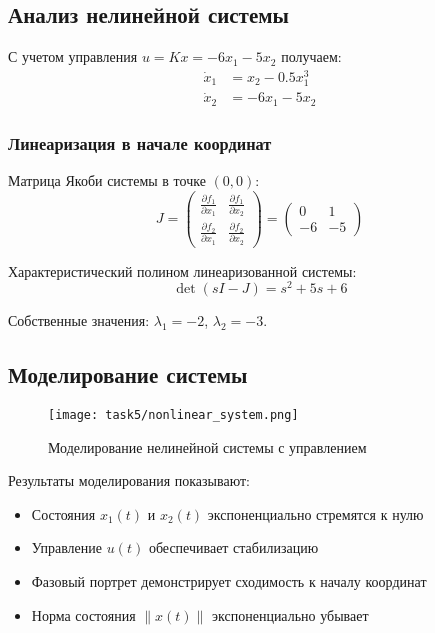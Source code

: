 \subsection{Анализ нелинейной системы}

С учетом управления $u = Kx = -6x_1 - 5x_2$ получаем:
\begin{align}
\dot{x}_1 &= x_2 - 0.5x_1^3 \\
\dot{x}_2 &= -6x_1 - 5x_2
\end{align}

\subsubsection{Линеаризация в начале координат}

Матрица Якоби системы в точке $(0,0)$:
\begin{equation}
J = \begin{pmatrix} 
\frac{\partial f_1}{\partial x_1} & \frac{\partial f_1}{\partial x_2} \\
\frac{\partial f_2}{\partial x_1} & \frac{\partial f_2}{\partial x_2}
\end{pmatrix} = \begin{pmatrix} 
0 & 1 \\
-6 & -5
\end{pmatrix}
\end{equation}

Характеристический полином линеаризованной системы:
\begin{equation}
\det(sI - J) = s^2 + 5s + 6
\end{equation}

Собственные значения: $\lambda_1 = -2$, $\lambda_2 = -3$.

\subsection{Моделирование системы}

\begin{figure}[H]
\centering
\texttt{[image: task5/nonlinear\_system.png]}
\caption{Моделирование нелинейной системы с управлением}
\label{fig:nonlinear_system}
\end{figure}

Результаты моделирования показывают:
\begin{itemize}
\item Состояния $x_1(t)$ и $x_2(t)$ экспоненциально стремятся к нулю
\item Управление $u(t)$ обеспечивает стабилизацию
\item Фазовый портрет демонстрирует сходимость к началу координат
\item Норма состояния $\|x(t)\|$ экспоненциально убывает
\end{itemize}

